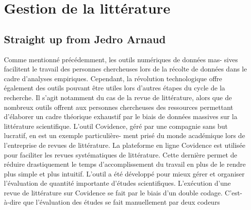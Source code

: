 \documentclass[
  letterpaper,
]{scrbook}
\begin{document}

\hypertarget{sec-chap4}{%
\chapter{Gestion de la littérature}\label{sec-chap4}}

\hypertarget{straight-up-from-jedro-arnaud}{%
\section{Straight up from Jedro
Arnaud}\label{straight-up-from-jedro-arnaud}}

Comme mentionné précédemment, les outils numériques de données mas-
sives facilitent le travail des personnes chercheuses lors de la récolte
de données dans le cadre d'analyses empiriques. Cependant, la révolution
technologique offre également des outils pouvant être utiles lors
d'autres étapes du cycle de la recherche. Il s'agit notamment du cas de
la revue de littérature, alors que de nombreux outils offrent aux
personnes chercheuses des ressources permettant d'élaborer un cadre
théorique exhaustif par le biais de données massives sur la littérature
scientifique. L'outil Covidence, géré par une compagnie sans but
lucratif, en est un exemple particulière- ment prisé du monde académique
lors de l'entreprise de revues de littérature. La plateforme en ligne
Covidence est utilisée pour faciliter les revues systématiques de
littérature. Cette dernière permet de réduire drastiquement le temps
d'accomplissement du travail en plus de le rendre plus simple et plus
intuitif. L'outil a été développé pour mieux gérer et organiser
l'évaluation de quantité importante d'études scientifiques. L'exécution
d'une revue de littérature sur Covidence se fait par le biais d'un
double codage. C'est- à-dire que l'évaluation des études se fait
manuellement par deux codeurs
\end{document}
